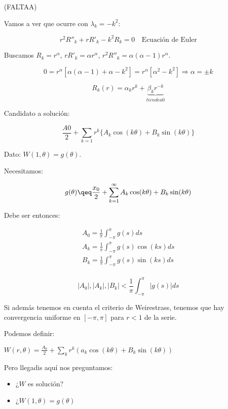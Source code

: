 		(FALTAA)










		Vamos a ver que ocurre con $\lambda_k = -k^2$:

		\[r^2 R''_k + r R'_k - k^2 R_k = 0 \quad \text{Ecuación de Euler}\]

		Buscamos $R_k = r^\alpha$, $rR'_k = \alpha r^\alpha$, $r^2 R''_k = \alpha(\alpha-1)r^\alpha$.

		\[ 0 = r^\alpha [\alpha(\alpha -1)+ \alpha - k^2] = r^\alpha [\alpha^2 - k^2] \Rightarrow \alpha = ± k \]

		\[ R_k(r) = \alpha_k r^k + \underbrace{\beta_k r^{-k}}_{tiende a 0}  \]


		Candidato a solución:

		\[\frac{A0}{2} + \sum_{k=1} r^k \{A_k \cos(k \theta) + B_k \sin(k\theta)\}   \]

		Dato: $W(1,\theta) = g(\theta)$.

		Necesitamos:

		\[ g(\theta) \qeq \frac{x_0}{2} + \sum_{k = 1}^{\infty} A_k \cos(k \theta) + B_k \sin(k \theta) \]

		Debe ser entonces:

		\[
		\begin{array}{l}
			A_0 = \frac{1}{\pi} \int_{-\pi}^{\pi} g(s) ds \\
			A_k = \frac{1}{\pi} \int_{-\pi}^{\pi} g(s)\cos(ks) ds \\
			B_k = \frac{1}{\pi} \int_{-\pi}^{\pi} g(s) \sin(ks) ds \\
		\end{array}
		\]

		\begin{obs}
			\[ |A_0|, |A_k|, |B_k| < \frac{1}{\pi} \int_{-\pi}^{\pi} |g(s)| ds \]

			Si además tenemos en cuenta el criterio de Weirestrass, tenemos que hay convergencia uniforme en $[-\pi,\pi]$ para $r<1$ de la serie.
		\end{obs}

		Podemos definir:

		\( W(r,\theta) = \frac{A_0}{2} + \sum_k r^k(a_k \cos(k \theta) + B_k \sin(k\theta)) \label{eq:serieW} \)

		Pero llegadis aquí nos preguntamos:

		\begin{itemize}
			\item ¿$W$ es solución?
			\item ¿$W(1, \theta) = g(\theta)$
		\end{itemize}


